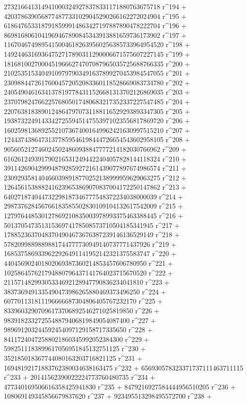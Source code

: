        2732166413149410003249278378331171880763675718 r^194 + 
       4203786390568774877331029045290266162272024904 r^195 + 
       6186476533187918599914863427197887890478222704 r^196 + 
       8698168061041969467890845343913881659736173902 r^197 + 
       11670467498954150046182639560256385733964954520 r^198 + 
       14924463169364752717890311290006671575607227145 r^199 + 
       18168100270004519666274707087965035725688766335 r^200 + 
       21025351534049109797903491637899270453984547055 r^201 + 
       23098844726176004572052083360118528669083734780 r^202 + 
       24054904616341378197784311526681313702126869035 r^203 + 
       23707982476622576805017480683217352337227547485 r^204 + 
       22076381838901248647970731188116529293893347305 r^205 + 
       19387322491433427255945147553971023556817869720 r^206 + 
       16025981368925521073674001649962421630997515210 r^207 + 
       12443743864731377859546198444726654543602958105 r^208 + 
       9056052127460245024860938847777214182030766962 r^209 + 
       6162612493917902165312494422404057828144118324 r^210 + 
       3911426904299948792859272161439077897674986574 r^211 + 
       2309293581404660398918770252138999959629063275 r^212 + 
       1264561538882416239653869070837004172250147862 r^213 + 
       640271874044732298187346777548372234038000039 r^214 + 
       298737628456766183585502830109104132617542009 r^215 + 
       127976448530127869210835003978993375463388445 r^216 + 
       50137054735131536974178508573710504185341945 r^217 + 
       17885236370483704904673676387239146136529149 r^218 + 
       5782099889889881744777730949140737771437926 r^219 + 
       1685375869339622926491141952142321375583747 r^220 + 
       440456902401802069387360214853457606780950 r^221 + 
       102586457621794880796437141764023715670520 r^222 + 
       21157148299305334692128947790836234041810 r^223 + 
       3837369491335490473986265880469373496250 r^224 + 
       607701131811196666687304806405767232170 r^225 + 
       83396032907096173706892546271025819850 r^226 + 
       9839182332725548879406819849054087400 r^227 + 
       989691203244592454097129158717335650 r^228 + 
       84117240472588021860345992052384300 r^229 + 
       5982511183899617056951845132751125 r^230 + 
       352185018367744080163203716821125 r^231 + 
       16948192171883762380034638163475 r^232 + 
       656930578323371737111463711115 r^233 + 
       20141562390022224773760480735 r^234 + 
       477340169506616358425941830 r^235 + 
       8479216927584444956510205 r^236 + 
       108069149345856679837620 r^237 + 923495513298495572700 r^238 + 
